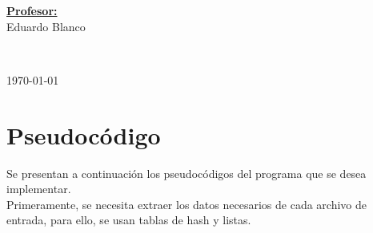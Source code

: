 \documentclass[11pt]{article}
\begin{document}
\begin{center}
   \begin{minipage}{\textwidth}    
      \vspace{-0.6cm}  
      \begin{flushright} \large    
         \textbf{\underline{Profesor:}} \\  
         Eduardo Blanco  
      \end{flushright}        
   \end{minipage} 

   \vspace*{1cm}
   \\
   \vspace{2cm}  

   \begin{center} 
      {\large \today} 
   \end{center}     
\end{center}                                                      
                                                               
\newpage
                                                    

\section{Pseudocódigo}

Se presentan a continuación los pseudocódigos del programa que
se desea implementar. \\

Primeramente, se necesita extraer los datos necesarios de cada
archivo de entrada, para ello, se usan tablas de hash y listas.
\end{document}
